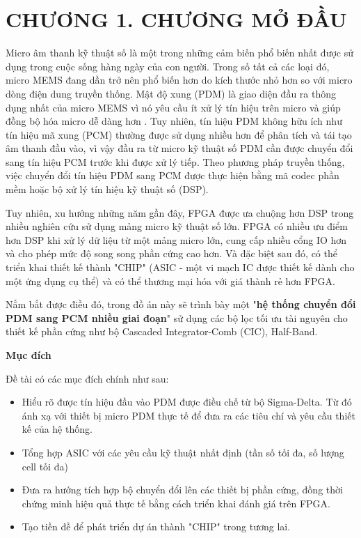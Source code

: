 \section*{CHƯƠNG 1.  CHƯƠNG MỞ ĐẦU}
Micro âm thanh kỹ thuật số là một trong những cảm biến phổ biến nhất được sử dụng trong cuộc sống hàng ngày của con người. Trong số tất cả các loại đó, micro MEMS đang dần trở nên phổ biến hơn do kích thước nhỏ hơn so với micro dòng điện dung truyền thống. Mật độ xung (PDM) là giao diện đầu ra thông dụng nhất của micro MEMS vì nó yêu cầu ít xử lý tín hiệu trên micro và giúp đồng bộ hóa micro dễ dàng hơn \cite{mems}. Tuy nhiên, tín hiệu PDM không hữu ích như tín hiệu mã xung (PCM) thường được sử dụng nhiều hơn để phân tích và tái tạo âm thanh đầu vào, vì vậy đầu ra từ micro kỹ thuật số PDM cần được chuyển đổi sang tín hiệu PCM trước khi được xử lý tiếp. Theo phương pháp truyền thống, việc chuyển đổi tín hiệu PDM sang PCM được thực hiện bằng mã codec phần mềm hoặc bộ xử lý tín hiệu kỹ thuật số (DSP).

Tuy nhiên, xu hướng những năm gần đây, FPGA được ưa chuộng hơn DSP trong nhiều nghiên cứu sử dụng mảng micro kỹ thuật số lớn. FPGA có nhiều ưu điểm hơn DSP khi xử lý dữ liệu từ một mảng micro lớn, cung cấp nhiều cổng IO hơn và cho phép mức độ song song phần cứng cao hơn. Và đặc biệt sau đó, có thể triển khai thiết kế thành "CHIP" (ASIC - một vi mạch IC được thiết kế dành cho một ứng dụng cụ thể) và có thể thương mại hóa với giá thành rẻ hơn FPGA.

Nắm bắt được điều đó, trong đồ án này sẽ trình bày một "\textbf{hệ thống chuyển đổi PDM sang PCM nhiều giai đoạn}" sử dụng các bộ lọc tối ưu tài nguyên cho thiết kế phần cứng như bộ Cascaded Integrator-Comb (CIC), Half-Band.

\noindent \textbf{Mục đích}

Đề tài có các mục đích chính như sau:
\begin{itemize}
    \item Hiểu rõ được tín hiệu đầu vào PDM được điều chế từ bộ Sigma-Delta. Từ đó ánh xạ với thiết bị micro PDM thực tế để đưa ra các tiêu chí và yêu cầu thiết kế của hệ thống.
    \item  Tổng hợp ASIC với các yêu cầu kỹ thuật nhất định (tần số tối đa, số lượng cell tối đa) 
    \item Đưa ra hướng tích hợp bộ chuyển đổi lên các thiết bị phần cứng, đồng thời chứng minh hiệu quả thực tế bằng cách triển khai đánh giá trên FPGA.
    \item Tạo tiền đề để phát triển dự án thành "CHIP" trong tương lai.
\end{itemize}

